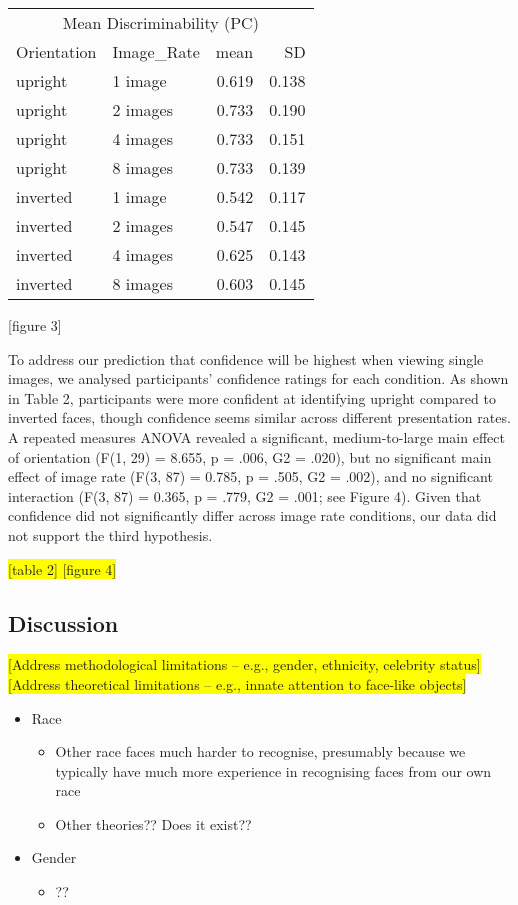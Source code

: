 \documentclass[
  english,
  man]{apa6}
\providecommand{\tightlist}{%
  \setlength{\itemsep}{0pt}\setlength{\parskip}{0pt}}
\begin{document}
\begin{tabular}{l|l|r|r}
\hline
\multicolumn{4}{c|}{Mean Discriminability (PC)} \\
\cline{1-4}
Orientation & Image\_Rate & mean & SD\\
\hline
upright & 1 image & 0.619 & 0.138\\
\hline
upright & 2 images & 0.733 & 0.190\\
\hline
upright & 4 images & 0.733 & 0.151\\
\hline
upright & 8 images & 0.733 & 0.139\\
\hline
inverted & 1 image & 0.542 & 0.117\\
\hline
inverted & 2 images & 0.547 & 0.145\\
\hline
inverted & 4 images & 0.625 & 0.143\\
\hline
inverted & 8 images & 0.603 & 0.145\\
\hline
\end{tabular}

{[}figure 3{]}

To address our prediction that confidence will be highest when viewing single images, we analysed participants' confidence ratings for each condition. As shown in Table 2, participants were more confident at identifying upright compared to inverted faces, though confidence seems similar across different presentation rates. A repeated measures ANOVA revealed a significant, medium-to-large main effect of orientation (F(1, 29) = 8.655, p = .006, G2 = .020), but no significant main effect of image rate (F(3, 87) = 0.785, p = .505, G2 = .002), and no significant interaction (F(3, 87) = 0.365, p = .779, G2 = .001; see Figure 4). Given that confidence did not significantly differ across image rate conditions, our data did not support the third hypothesis.

\colorbox{yellow}{[table 2]
[figure 4]}

\hypertarget{discussion}{%
\subsection{Discussion}\label{discussion}}

\colorbox{yellow}{[Address methodological limitations – e.g., gender, ethnicity, celebrity status]
[Address theoretical limitations – e.g., innate attention to face-like objects]}

\begin{itemize}
\tightlist
\item
  Race

  \begin{itemize}
  \tightlist
  \item
    Other race faces much harder to recognise, presumably because we typically have much more experience in recognising faces from our own race
  \item
    Other theories?? Does it exist??
  \end{itemize}
\item
  Gender

  \begin{itemize}
  \tightlist
  \item
    ??
  \end{itemize}
\end{itemize}
\end{document}
